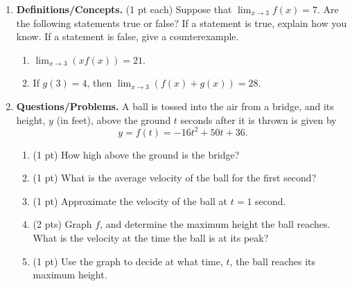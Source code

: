 \documentclass[11pt,letterpaper]{article}
\begin{document}
\begin{enumerate}
\item  \textbf{Definitions/Concepts.} (1 pt each) Suppose that $\lim_{x\rightarrow 3}f(x)=7$.  Are the following statements true or false?  If a statement is true, explain how you know.  If a statement is false, give a counterexample.
\begin{enumerate} 
\item $\lim_{x\rightarrow 3}\left(xf(x)\right)=21$.  

\vspace{3pc}
\item If $g(3)=4$, then $\lim_{x\rightarrow 3}\left(f(x)+g(x)\right)=28$.

\vspace{3pc}
\end{enumerate}

\item \textbf{Questions/Problems.} A ball is tossed into the air from a bridge, and its height, $y$ (in feet), above the ground $t$ seconds after it is thrown is given by 
\[y=f(t)=-16t^2+50t+36.\]
\begin{enumerate}
\item (1 pt) How high above the ground is the bridge? 

\vspace{2pc}
\item (1 pt) What is the average velocity of the ball for the first second?

\vspace{2pc}
\item (1 pt) Approximate the velocity of the ball at $t=1$ second.

\vspace{2pc}
\item (2 pts) Graph $f$, and determine the maximum height the ball reaches.  What is the velocity at the time the ball is at its peak?

\vspace{10pc}
\item (1 pt) Use the graph to decide at what time, $t$, the ball reaches its maximum height.

\vspace{2pc}
\end{enumerate}


\end{enumerate}
\end{document}
